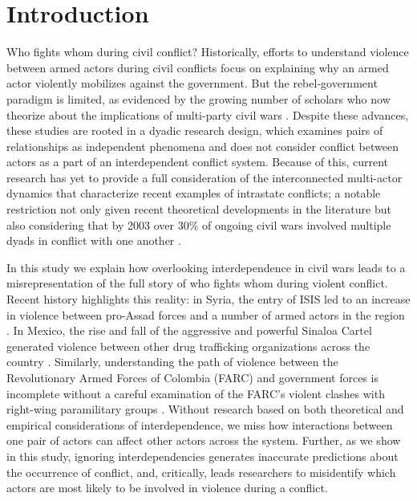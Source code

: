 \section*{Introduction}

Who fights whom during civil conflict? Historically, efforts to understand violence between armed actors during civil conflicts focus on explaining why an armed actor violently mobilizes against the government. But the rebel-government paradigm is limited, as evidenced by the growing number of scholars who now theorize about the implications of multi-party civil wars \citep{cunningham:2006,akcinaroglu:2012}. Despite these advances, these studies are rooted in a dyadic research design, which examines pairs of relationships as independent phenomena and does not consider conflict between actors as a part of an interdependent conflict system. Because of this, current research has yet to provide a full consideration of the interconnected multi-actor dynamics that characterize recent examples of intrastate conflicts;  a notable restriction not only given recent theoretical developments in the literature but also considering that by 2003 over 30\% of ongoing civil wars involved multiple dyads in conflict with one another \citep{harbom:etal:2008}. 

In this study we explain how overlooking interdependence in civil wars leads to a misrepresentation of the full story of who fights whom during violent conflict. Recent history highlights this reality: in Syria, the entry of ISIS led to an increase in violence between pro-Assad forces and a number of armed actors in the region \citep{beauchamp:2014, schmitt:2018}. In Mexico, the rise and fall of the aggressive and powerful Sinaloa Cartel generated violence between other drug trafficking organizations across the country \citep{rosa:shirk:2018}. Similarly, understanding the path of violence between the Revolutionary Armed Forces of Colombia (FARC) and government forces is incomplete without a careful examination of the FARC's violent clashes with right-wing paramilitary groups \citep{alesma:2015}. Without research based on both theoretical and empirical considerations of interdependence, we miss how interactions between one pair of actors can affect other actors across the system. Further, as we show in this study, ignoring interdependencies generates inaccurate predictions about the occurrence of conflict, and, critically, leads researchers to  misidentify which actors are most likely to be involved in violence during a conflict. 

